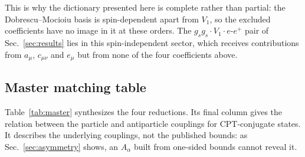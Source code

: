 \documentclass[
  aps,
  prd,
  reprint,
  amsmath,
  amssymb,
  nofootinbib,
  superscriptaddress,
  floatfix
]{revtex4-2}
\newcommand{\Aalpha}{A_\alpha}
\begin{document}
This is why the dictionary presented here is complete rather than partial:
the Dobrescu--Mocioiu basis is spin-dependent apart from $V_1$, so the
excluded coefficients have no image in it at these orders. The
$g_sg_s\cdot V_1\cdot e$-$e^+$ pair of Sec.~\ref{sec:results} lies in
this spin-independent sector, which receives contributions from $a_\mu$,
$c_{\mu\nu}$ and $e_\mu$ but from none of the four coefficients above.

\subsection{Master matching table}

Table~\ref{tab:master} synthesizes the four reductions. Its final column
gives the relation between the particle and antiparticle couplings for
CPT-conjugate states. It describes the underlying couplings, not the
published bounds: as Sec.~\ref{sec:asymmetry} shows, an $\Aalpha$ built
from one-sided bounds cannot reveal it.
\end{document}
